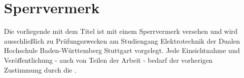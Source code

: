 \chapter*{Sperrvermerk}
\thispagestyle{empty}
Die vorliegende {\projectType} mit dem Titel \textit{\projectTitle}
ist mit einem Sperrvermerk versehen und wird ausschließlich zu Prüfungszwecken
am Studiengang Elektrotechnik der Dualen Hochschule Baden-Württemberg
Stuttgart vorgelegt. Jede Einsichtnahme und Veröffentlichung - auch von
Teilen der Arbeit - bedarf der vorherigen Zustimmung durch die {\company}.
